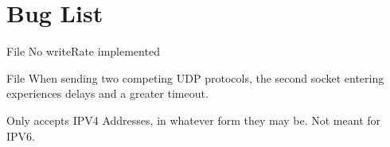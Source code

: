 \chapter{Bug List}
\hypertarget{bug}{}\label{bug}

\begin{DoxyRefList}
\item[File \doxylink{receiver_8c}{receiver.c} ]\label{bug__bug000001}%
%
No write\+Rate implemented 
\item[File \doxylink{sender_8c}{sender.c} ]\label{bug__bug000002}%
%
When sending two competing UDP protocols, the second socket entering experiences delays and a greater timeout. 



Only accepts IPV4 Addresses, in whatever form they may be. Not meant for IPV6. 
\end{DoxyRefList}